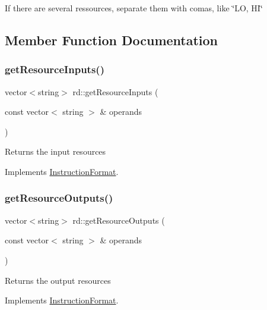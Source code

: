 If there are several ressources, separate them with comas, like \char`\"{}\+L\+O, H\+I\char`\"{} 

\subsection{Member Function Documentation}
\mbox{\label{classrd_a06b5b25f6e269bb121ad8ab63283f599}} 
\subsubsection{\texorpdfstring{get\+Resource\+Inputs()}{getResourceInputs()}}
{\footnotesize\ttfamily vector$<$string$>$ rd\+::get\+Resource\+Inputs (\begin{DoxyParamCaption}\item[{const vector$<$ string $>$ \&}]{operands }\end{DoxyParamCaption})\hspace{0.3cm}{\ttfamily [virtual]}}

Returns the input resources 

Implements \hyperlink{classInstructionFormat_a09775d3a3c22f40a0f44504664e586e4}{Instruction\+Format}.

\mbox{\label{classrd_a148dde5e9f8d3c68d5563dd8ec2c1bff}} 
\subsubsection{\texorpdfstring{get\+Resource\+Outputs()}{getResourceOutputs()}}
{\footnotesize\ttfamily vector$<$string$>$ rd\+::get\+Resource\+Outputs (\begin{DoxyParamCaption}\item[{const vector$<$ string $>$ \&}]{operands }\end{DoxyParamCaption})\hspace{0.3cm}{\ttfamily [virtual]}}

Returns the output resources 

Implements \hyperlink{classInstructionFormat_a95cd28ffb1bde59b67f676880ab10536}{Instruction\+Format}.

\mbox{\label{classrd_a8a37174ea94c394743494d3e735d6363}} 
